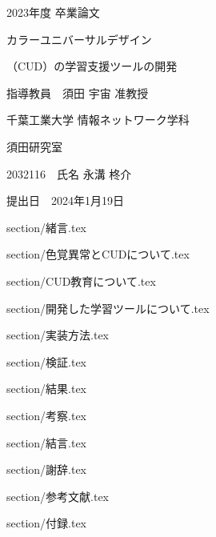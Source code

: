 \documentclass[12pt,a4j,titlepage]{ltjsarticle}
\begin{document}
\begin{titlepage}
  \centering
    \vspace*{40truept}
    {\LARGE 2023年度 卒業論文}
    
    \vspace*{75truept}
    
    {\Huge カラーユニバーサルデザイン}
\vspace*{18truept}

    {\Huge （CUD）の学習支援ツールの開発}%

    \vspace{85truept}
    
    {\LARGE 指導教員　須田 宇宙 准教授}
    
    \vspace{60truept}
    
    {\LARGE 千葉工業大学 情報ネットワーク学科}
    
    \vspace{15truept}
    
    {\LARGE 須田研究室}
    
    \vspace{70truept}
    
    {\LARGE 2032116　氏名 永溝 柊介 }　%

    \vspace{70truept}
    
  \begin{flushright}

    \LARGE {提出日　2024年1月19日}
  
  \end{flushright}
\end{titlepage}
\date{}

\tableofcontents
\newpage
\listoftables
\newpage
\listoffigures
\newpage

 {section/緒言.tex}
\clearpage

 {section/色覚異常とCUDについて.tex}
\clearpage

 {section/CUD教育について.tex}
\clearpage

 {section/開発した学習ツールについて.tex}
\clearpage

 {section/実装方法.tex}
\clearpage

 {section/検証.tex}
\clearpage

 {section/結果.tex}

 {section/考察.tex}
\clearpage

 {section/結言.tex}
\clearpage

 {section/謝辞.tex}
\clearpage

 {section/参考文献.tex}
\clearpage

 {section/付録.tex}
\clearpage
\end{document}
